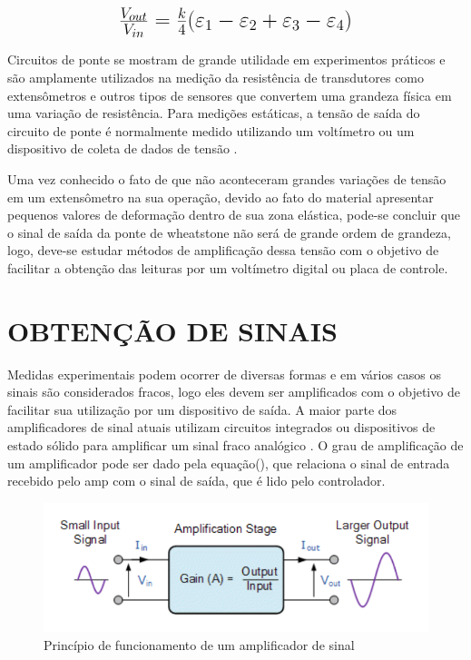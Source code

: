 \begin{equation}\label{eq:Eq_220}%
\mbox{\fontsize{17.28}{21.6}\selectfont\( %
\frac{V_{out}}{V_{in}} = \frac{k}{4}(\varepsilon_1 - \varepsilon_2 + \varepsilon_3 - \varepsilon_4)
\)} %
\end{equation}

\hfill

Circuitos de ponte se mostram de grande utilidade em experimentos práticos e são amplamente utilizados na medição da resistência de transdutores como extensômetros e outros tipos de sensores que convertem uma grandeza física em uma variação de resistência. Para medições estáticas, a tensão de saída do circuito de ponte é normalmente medido utilizando um voltímetro ou um dispositivo de coleta de dados de tensão \autocite{Hollman2011}.

Uma vez conhecido o fato de que não aconteceram grandes variações de tensão em um extensômetro na sua operação, devido ao fato do material apresentar pequenos valores de deformação dentro de sua zona elástica, pode-se concluir que o sinal de saída da ponte de wheatstone não será de grande ordem de grandeza, logo, deve-se estudar métodos de amplificação dessa tensão com o objetivo de facilitar a obtenção das leituras por um voltímetro digital ou placa de controle.

\section{OBTENÇÃO DE SINAIS}

Medidas experimentais podem ocorrer de diversas formas e em vários casos os sinais são considerados fracos, logo eles devem ser amplificados com o objetivo de facilitar sua utilização por um dispositivo de saída. A maior parte dos amplificadores de sinal atuais utilizam circuitos integrados ou dispositivos de estado sólido para amplificar um sinal fraco analógico \autocite{Hollman2011}. O grau de amplificação de um amplificador pode ser dado pela equação(), que relaciona o sinal de entrada recebido pelo amp com o sinal de saída, que é lido pelo controlador.

\begin{figure}[htb]
	\caption{\label{fig:1100} Princípio de funcionamento de um amplificador de sinal}
	\begin{center}
		\includegraphics[width=\textwidth]{pictures/1100.png}
	\end{center}
\end{figure}

